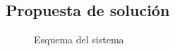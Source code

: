 \newpage
\subsection{Propuesta de solución}

\vspace*{\fill}
\noindent
\begin{figure}[htb]
    \centering
    \caption{Esquema del sistema}
    \label{fig:esquema}
\end{figure}


